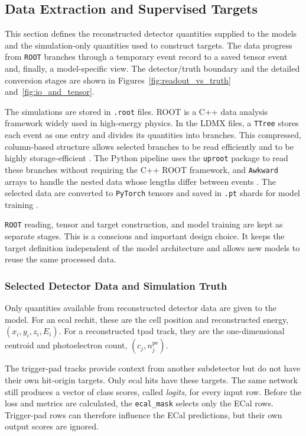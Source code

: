 \subsection{Data Extraction and Supervised Targets}
\label{sec:method_processing}

This section defines the reconstructed detector quantities supplied to the
models and the simulation-only quantities used to construct targets. The data
progress from \texttt{ROOT} branches through a temporary event record to a
saved tensor event and, finally, a model-specific view. The detector/truth
boundary and the detailed conversion stages are shown in
Figures~\ref{fig:readout_vs_truth} and~\ref{fig:io_and_tensor}.

The simulations are stored in \texttt{.root} files. ROOT is a C++ data
analysis framework widely used in high-energy physics. In the LDMX files, a
\texttt{TTree} stores each event as one entry and divides its quantities into
branches. This compressed, column-based structure allows selected branches to
be read efficiently and to be highly storage-efficient \cite{ROOT_NIMA_1997,root_about,root_ttree}. The Python
pipeline uses the \texttt{uproot} package to read these branches without requiring the
C++ ROOT framework, and \texttt{Awkward} arrays to handle the nested data whose
lengths differ between events \cite{uproot_software,uproot_docs,awkward_docs}.
The selected data are converted to \texttt{PyTorch} tensors and saved in
\texttt{.pt} shards for model training \cite{pytorch_docs}.

\texttt{ROOT} reading, tensor and target construction, and model training are
kept as separate stages. This is a conscious and important design choice. It
keeps the target definition independent of the model architecture and allows
new models to reuse the same processed data.

\subsubsection{Selected Detector Data and Simulation Truth}

Only quantities available from reconstructed detector data are given to the
model. For an \gls{ecal} \gls{rechit}, these are the cell position and reconstructed
energy, \((x_i,y_i,z_i,E_i)\). For a reconstructed \gls{tpad} track, they are
the one-dimensional centroid and photoelectron count,
\((c_j,n_j^{\mathrm{pe}})\).

The trigger-pad tracks provide context from another subdetector but do not
have their own hit-origin targets. Only \gls{ecal} hits have these targets.
The same network still produces a vector of class scores, called
\textit{logits}, for every input row. Before the loss and metrics are
calculated, the \texttt{ecal\_mask} selects only the ECal rows. Trigger-pad
rows can therefore influence the ECal predictions, but their own output
scores are ignored.

